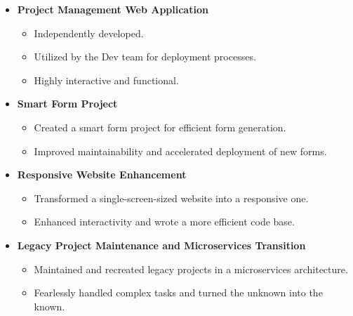 \documentclass[oneside]{article}
\begin{document}
{\begin{minipage}[t][\dimexpr\textheight-2\fboxrule-2\fboxsep\relax][t]{\dimexpr0.55\textwidth-2\fboxrule-2\fboxsep\relax}
\begin{itemize}
            \item \textbf{\normalsize Project Management Web Application}
            \vspace{-0.5\baselineskip} 
            \begin{itemize}
                \item Independently developed.
                \item Utilized by the Dev team for deployment processes.
                \item Highly interactive and functional.
            \end{itemize}
            \vspace{0.5\baselineskip} 

            \item \textbf{\normalsize Smart Form Project}
            \vspace{-0.5\baselineskip} 
            \begin{itemize}
                \item Created a smart form project for efficient form generation.
                \item Improved maintainability and accelerated deployment of new forms.
            \end{itemize}
            \vspace{0.5\baselineskip} 

            \item \textbf{\normalsize Responsive Website Enhancement}
            \vspace{-0.5\baselineskip} 
            \begin{itemize}
                \item Transformed a single-screen-sized website into a responsive one.
                \item Enhanced interactivity and wrote a more efficient code base.
            \end{itemize}
            \vspace{0.5\baselineskip} 

            \item \textbf{\normalsize Legacy Project Maintenance and Microservices Transition}
            \vspace{-0.5\baselineskip} 
            \begin{itemize}
                \item Maintained and recreated legacy projects in a microservices architecture.
                \item Fearlessly handled complex tasks and turned the unknown into the known.
            \end{itemize}
            \vspace{0.5\baselineskip} 


\end{itemize}
\end{minipage}}
\end{document}
